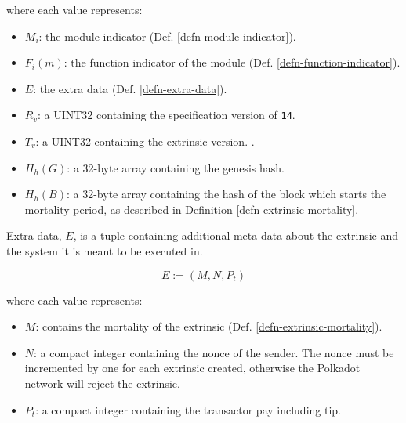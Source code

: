\begin{definition}
    where each value represents:
    \begin{itemize}
        \item $M_i$: the module indicator (Def. \ref{defn-module-indicator}).
        \item $F_i(m)$: the function indicator of the module
        (Def. \ref{defn-function-indicator}).
        \item $E$: the extra data (Def. \ref{defn-extra-data}).
        \item $R_v$: a UINT32 containing the specification version of \verb|14|.
        \item $T_v$: a UINT32 containing the extrinsic version.
        .
        \item $H_h(G)$: a 32-byte array containing the genesis hash.
        \item $H_h(B)$: a 32-byte array containing the hash of the block which
        starts the mortality period, as described in Definition
        \ref{defn-extrinsic-mortality}.
    \end{itemize}
\end{definition}

\begin{definition}
    \label{defn-extra-data}
    Extra data, $E$, is a tuple containing additional meta data about the
    extrinsic and the system it is meant to be executed in.

    \[
        E := (M, N, P_t)
    \]

    where each value represents:
    \begin{itemize}
        \item $M$: contains the mortality of the extrinsic (Def. \ref{defn-extrinsic-mortality}).
        \item $N$: a compact integer containing the nonce of the sender. The
        nonce must be incremented by one for each extrinsic created, otherwise
        the Polkadot network will reject the extrinsic.
        \item $P_t$: a compact integer containing the transactor pay including tip.
    \end{itemize}

\end{definition}

